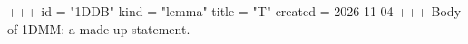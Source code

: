 +++
id = "1DDB"
kind = "lemma"
title = "T"
created = 2026-11-04
+++
Body of 1DMM: a made-up statement.
